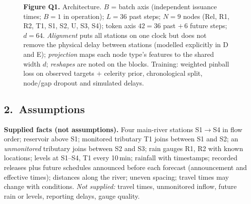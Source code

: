 \begin{figure}[H]
\caption*{\textbf{Figure Q1.} Architecture. $B$ = batch axis (independent issuance times; $B{=}1$ in operation); $L{=}36$ past steps; $N{=}9$ nodes (Rel, R1, R2, T1, S1, S2, U, S3, S4); token axis $42=36$ past $+\,6$ future steps; $d{=}64$. \emph{Alignment} puts all stations on one clock but does not remove the physical delay between stations (modelled explicitly in D and E); \emph{projection} maps each node type's features to the shared width $d$; \emph{reshapes} are noted on the blocks. Training: weighted pinball loss on observed targets $+$ celerity prior, chronological split, node/gap dropout and simulated delays.}
\end{figure}

\subsection*{2.\ Assumptions}
\noindent\textbf{Supplied facts (not assumptions).} Four main-river stations S1$\to$S4 in flow order; reservoir above S1; monitored tributary T1 joins between S1 and S2; an \emph{unmonitored} tributary joins between S2 and S3; rain gauges R1, R2 with known locations; levels at S1--S4, T1 every 10\,min; rainfall with timestamps; recorded releases plus future schedules announced before each forecast (announcement and effective times); distances along the river; uneven spacing; travel times may change with conditions. \emph{Not supplied:} travel times, unmonitored inflow, future rain or levels, reporting delays, gauge quality.

